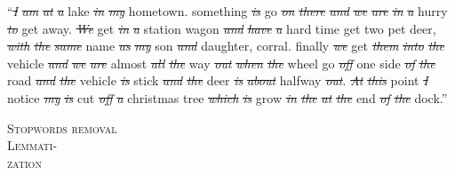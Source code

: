 \begin{minipage}[t]{\textwidth}
\begin{minipage}[t]{0.75\textwidth}
    \begin{spacing}{0.5}
    {\scriptsize
    ``\sout{\it I} \sout{\it am} \sout{\it at} \sout{\it a} {\color{orangeUnicam}lake} \sout{\it in} \sout{\it my} {\color{orangeUnicam} hometown}.
    {\color{orangeUnicam}something} \sout{\it is} {\color{orangeUnicam}go} \sout{\it on} \sout{\it there} \sout{\it and} \sout{\it we} \sout{\it are} \sout{\it in}
    \sout{\it a} {\color{orangeUnicam}hurry} \sout{\it to} {\color{orangeUnicam}get} {\color{orangeUnicam}away}.
    \sout{\it We} {\color{orangeUnicam}get} \sout{\it in} \sout{\it a} {\color{orangeUnicam}station} {\color{orangeUnicam}wagon} \sout{\it and} \sout{\it have} \sout{\it a}
    {\color{orangeUnicam}hard} {\color{orangeUnicam}time} {\color{orangeUnicam}get} {\color{orangeUnicam}two} {\color{orangeUnicam}pet} {\color{orangeUnicam}deer}, \sout{\it with} \sout{\it the}
    \sout{\it same} {\color{orangeUnicam}name} \sout{\it as} \sout{\it my} {\color{orangeUnicam}son} \sout{\it and} {\color{orangeUnicam}daughter}, {\color{orangeUnicam}corral}.
    {\color{orangeUnicam}finally} \sout{\it we} {\color{orangeUnicam}get} \sout{\it them} \sout{\it into} \sout{\it the} {\color{orangeUnicam}vehicle} \sout{\it and} \sout{\it we}
    \sout{\it are} {\color{orangeUnicam}almost} \sout{\it all} \sout{\it the} {\color{orangeUnicam}way} \sout{\it out} \sout{\it when} \sout{\it the} {\color{orangeUnicam}wheel}
    {\color{orangeUnicam}go} \sout{\it off} {\color{orangeUnicam}one} {\color{orangeUnicam}side} \sout{\it of} \sout{\it the} {\color{orangeUnicam}road}
    \sout{\it and} \sout{\it the} {\color{orangeUnicam}vehicle} \sout{\it is} {\color{orangeUnicam}stick} \sout{\it and} \sout{\it the} {\color{orangeUnicam}deer} \sout{\it is}
    \sout{\it about} {\color{orangeUnicam}halfway} \sout{\it out}.
    \sout{\it At} \sout{\it this} {\color{orangeUnicam}point} \sout{\it I} {\color{orangeUnicam}notice} \sout{\it my}  \sout{\it is}
    {\color{orangeUnicam}cut} \sout{\it off} \sout{\it a} {\color{orangeUnicam}christmas} {\color{orangeUnicam}tree} \sout{\it which} \sout{\it is} {\color{orangeUnicam}grow}
    \sout{\it in} \sout{\it the}  \sout{\it at} \sout{\it the} {\color{orangeUnicam}end} \sout{\it of} \sout{\it the} {\color{orangeUnicam}dock}.''}
    \end{spacing}
\end{minipage}
\hfill
    \begin{minipage}[t]{0.23\textwidth}
        \centering
        {\color{orangeUnicam} \scshape \small Stopwords removal} \\
        \medskip
        {\color{orangeUnicam} \scshape \small Lemmati-\\ zation}
    \end{minipage}
\end{minipage}
